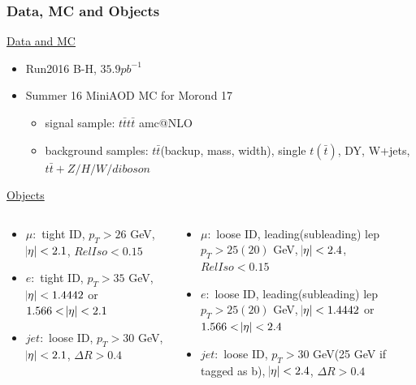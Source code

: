 \documentclass{beamer}
\begin{document}
\begin{frame}
\frametitle{Data, MC and Objects}
	\underline{\small {Data and MC}}
	\begin{itemize}
		\item {\small Run2016 B-H, $35.9 pb^{-1}$}
		\item {\small Summer 16 MiniAOD MC for Morond 17}
		\begin{itemize}
			\item signal sample: $t\bar{t}t\bar{t}$ amc@NLO
			\item background samples: $t\bar{t}$(backup, mass, width), single $t(\bar{t})$, DY, W+jets, $t\bar{t}+Z/H/W/diboson$
		\end{itemize}
	\end{itemize}
	\underline{{\small Objects}}
	\vspace{-20pt}
	\begin{columns}
		\begin{column}{0.5\textwidth}  \vspace{-15pt}
			\begin{itemize}
				\item $\mu:$ {\scriptsize tight ID, $p_{T}>26$ GeV, $\abs{\eta}<2.1$, $RelIso<0.15$} 
				\item $e:$ {\scriptsize tight ID, $p_{T}>35$ GeV, $\abs{\eta}<1.4442$ or $1.566<\abs{\eta}<2.1$} 
				\item $jet:$ {\scriptsize loose ID, $p_{T}>30$ GeV, $\abs{\eta}<2.1$, $\Delta R>0.4$} 
			\end{itemize}
		\end{column}
		\begin{column}{0.5\textwidth}
			\begin{itemize}
				\item $\mu:$ {\scriptsize loose ID, leading(subleading) lep $p_{T}>25(20)$ GeV, $\abs{\eta}<2.4$, $RelIso<0.15$}  \vspace{-5pt}
				\item $e:$ {\scriptsize loose ID, leading(subleading) lep $p_{T}>25(20)$ GeV, $\abs{\eta}<1.4442$ or $1.566<\abs{\eta}<2.4$} \vspace{-5pt}
				\item $jet:$ {\scriptsize loose ID, $p_{T}>30$ GeV(25 GeV if tagged as b), $\abs{\eta}<2.4$, $\Delta R>0.4$} 
			\end{itemize}
		\end{column}
	\end{columns}
\end{frame}
\end{document}
